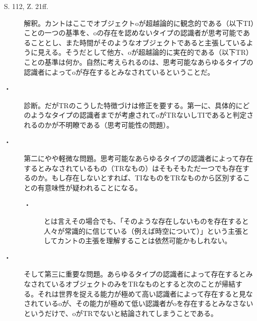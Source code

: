 \documentclass[a4j, 12pt,leqno]{jsarticle}
\begin{document}
\begin{description}
\item[S. 112, Z. 21ff.]解釈。カントはここでオブジェクトoが超越論的に観念的である（以下TI）ことの一つの基準を、oの存在を認めないタイプの認識者が思考可能であることとし、また時間がそのようなオブジェクトであると主張しているように見える。そうだとして他方、oが超越論的に実在的である（以下TR）ことの基準は何か。自然に考えられるのは、思考可能なあらゆるタイプの認識者によってoが存在するとみなされているということだ。
\item[・]診断。だがTRのこうした特徴づけは修正を要する。第一に、具体的にどのようなタイプの認識者までが考慮されてoがTRないしTIであると判定されるのかが不明瞭である（思考可能性の問題）。
\item[・]第二にやや軽微な問題。思考可能なあらゆるタイプの認識者によって存在するとみなされているもの（TRなもの）はそもそもただ一つでも存在するのか。もし存在しないとすれば、TIなものをTRなものから区別することの有意味性が疑われることになる。
\begin{description}
\item[・]とは言えその場合でも、「そのような存在しないものを存在すると人々が常識的に信じている（例えば時空について）」という主張としてカントの主張を理解することは依然可能かもしれない。
\end{description}
\item[・]そして第三に重要な問題。あらゆるタイプの認識者によって存在するとみなされているオブジェクトのみをTRなものとすると次のことが帰結する。それは世界を捉える能力が極めて高い認識者によって存在すると見なされているoが、その能力が極めて低い認識者がoを存在するとみなさないというだけで、oがTRでないと結論されてしまうことである。
\end{description}
\end{document}
